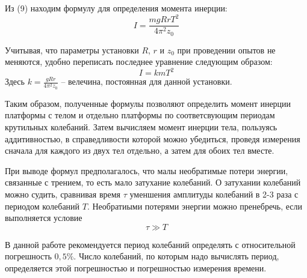 \documentclass[a4paper,12pt]{article} %
\begin{document}
Из (9) находим формулу для определения момента инерции:
\begin{equation}
I = \frac{mgRrT^2}{4\pi^2z_0}
\end{equation}

Учитывая, что параметры установки $R$, $r$ и $z_0$ при проведении опытов не меняются, удобно переписать последнее уравнение следующим образом:
\begin{equation}
I = kmT^2
\end{equation}
Здесь $k = \frac{gRr}{4\pi^2z_0}$ -- велечина, постоянная для данной установки.

Таким образом, полученные формулы позволяют определить момент инерции платформы с телом и отдельно платформы по соответсвующим периодам крутильных колебаний. Затем вычисляем момент инерции тела, пользуясь аддитивностью, в справедливости которой можно убедиться, проведя измерения сначала для каждого из двух тел отдельно, а затем для обоих тел вместе.

При выводе формул предполагалось, что малы необратимые потери энергии, связанные с трением, то есть мало затухание колебаний. О затухании колебаний можно судить, сравнивая время $\tau$ уменшения амплитуды колебаний в 2-3 раза с периодом колебаний $T$. Необратиыми потерями энергии можно пренебречь, если выполняется условие 
\begin{equation}
\tau \gg T
\end{equation}

В данной работе рекомендуется период колебаний определять с относительной погрешность $0,5\%$. Число колебаний, по которым надо вычислять период, определяется этой погрешностью и погрешностью измерения времени.
\end{document}
